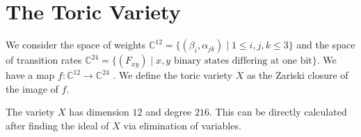 \section{The Toric Variety}

We consider the space of weights $\mathbb C^{12} = \{(\beta_{i},\alpha_{jk})\mid 1\leq i,j,k\leq 3\}$ and the space of transition rates $\mathbb C^{24} = \{(F_{xy}) \mid x,y \text{ binary states differing at one bit}\}$. We have a map
$f\colon \mathbb C^{12}\to \mathbb C^{24}$ . We define the toric variety $X$ as the Zariski closure of the image of $f$.

\begin{calculation}
The variety $X$ has dimension $12$ and degree $216$. This can be directly calculated after finding the ideal of $X$ via elimination of variables. 
\end{calculation}